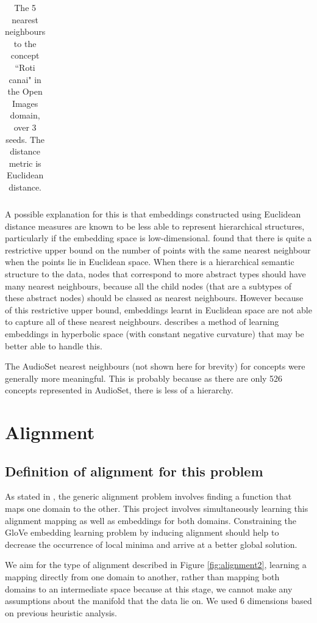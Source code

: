 \begin{table}[H]
\begin{tabular}{@{}llll@{}}
\end{tabular}
\centering
\caption{The 5 nearest neighbours to the concept ``Roti canai" in the Open Images domain, over 3 seeds. The distance metric is Euclidean distance. }
\end{table}

A possible explanation for this is that embeddings constructed using Euclidean distance measures are known to be less able to represent hierarchical structures, particularly if the embedding space is low-dimensional. \cite{NNAnalysisPsychologicalSpaces} found that there is quite a restrictive upper bound on the number of points with the same nearest neighbour when the points lie in Euclidean space. When there is a hierarchical semantic structure to the data, nodes that correspond to more abstract types should have many nearest neighbours, because all the child nodes (that are a subtypes of these abstract nodes) should be classed as nearest neighbours. However because of this restrictive upper bound, embeddings learnt in Euclidean space are not able to capture all of these nearest neighbours. \cite{PoincareEmbeddings} describes a method of learning embeddings in hyperbolic space (with constant negative curvature) that may be better able to handle this.

The AudioSet nearest neighbours (not shown here for brevity) for concepts were generally more meaningful. This is probably because as there are only 526 concepts represented in AudioSet, there is less of a hierarchy. 


\section{Alignment}

\subsection{Definition of alignment for this problem}
\label{section:alignmentdef}
As stated in \cite{ManifoldLearningTheoryAndApplications}, the generic alignment problem involves finding a function that maps one domain to the other. This project involves simultaneously learning this alignment mapping as well as embeddings for both domains.  Constraining the GloVe embedding learning problem by inducing alignment should help to decrease the occurrence of local minima and arrive at a better global solution. 

We aim for the type of alignment described in Figure \ref{fig:alignment2}, learning a mapping directly from one domain to another, rather than mapping both domains to an intermediate space because at this stage, we cannot make any assumptions about the manifold that the data lie on. We used 6 dimensions based on previous heuristic analysis.  

